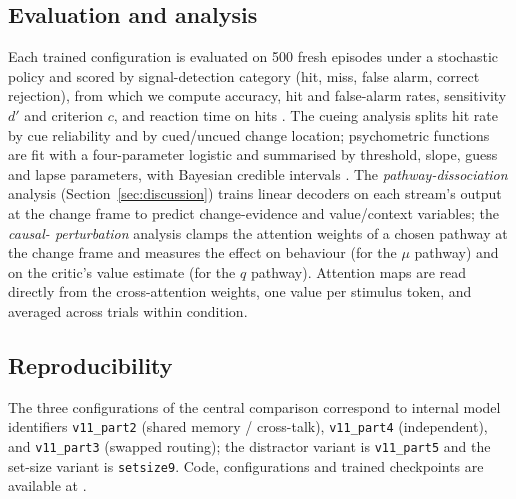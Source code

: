 \subsection{Evaluation and analysis}
Each trained configuration is evaluated on 500 fresh episodes under a stochastic policy and
scored by signal-detection category (hit, miss, false alarm, correct rejection), from which we
compute accuracy, hit and false-alarm rates, sensitivity $d'$ and criterion $c$, and reaction
time on hits \citep{green1966signal, macmillan2004detection}. The cueing analysis splits hit
rate by cue reliability and by cued/uncued change location; psychometric functions are fit with
a four-parameter logistic and summarised by threshold, slope, guess and lapse parameters, with
Bayesian credible intervals \citep{wichmann2001psychometric}. The \emph{pathway-dissociation}
analysis (Section~\ref{sec:discussion}) trains linear decoders on each stream's output at the
change frame to predict change-evidence and value/context variables; the \emph{causal-
perturbation} analysis clamps the attention weights of a chosen pathway at the change frame and
measures the effect on behaviour (for the $\mu$ pathway) and on the critic's value estimate (for
the $q$ pathway). Attention maps are read directly from the cross-attention weights, one value
per stimulus token, and averaged across trials within condition.

\subsection{Reproducibility}
The three configurations of the central comparison correspond to internal model identifiers
\texttt{v11\_part2} (shared memory / cross-talk), \texttt{v11\_part4} (independent), and
\texttt{v11\_part3} (swapped routing); the distractor variant is \texttt{v11\_part5} and the
set-size variant is \texttt{setsize9}. Code, configurations and trained checkpoints are
available at .
